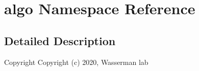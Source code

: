 \hypertarget{namespacealgo}{}\section{algo Namespace Reference}
\label{namespacealgo}


\subsection{Detailed Description}
\begin{DoxyCopyright}{Copyright}
Copyright (c) 2020, Wasserman lab 
\end{DoxyCopyright}
